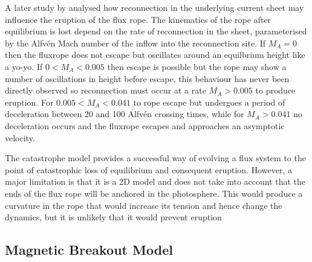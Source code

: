 A later study by \citet{priest2000} analysed how reconnection in the underlying current sheet may influence the eruption of the flux rope. The kinematics of the rope after equilibrium is lost depend on the rate of reconnection in the sheet, parameterised by the Alfv\'{e}n Mach number of the inflow into the reconnection site. If $M_A=0$ then the fluxrope does not escape but oscillates around an equilbrium height like a yo-yo. If $0<M_A<0.005$ then escape is possible but the rope may show a number of oscillations in height before escape, this behaviour has never been directly observed so reconnection must occur at a rate $M_A>0.005$ to produce eruption.  For $0.005<M_A<0.041$ to rope escape but undergoes a period of deceleration between 20 and 100 Alfv\'{e}n crossing times, while for $M_A > 0.041$ no deceleration occurs and the fluxrope escapes and approaches an asymptotic velocity.

The catastrophe model provides a successful way of evolving a flux system to the point of catastrophic loss of equilibrium and consequent eruption. However, a major limitation is that it is a 2D model and does not take into account that the ends of the flux rope will be anchored in the photosphere. This would produce a curvature in the rope that would increase its tension and hence change the dynamics, but it is unlikely that it would prevent eruption \citep{steele1989}




\subsection{Magnetic Breakout Model}\label{sec:21}

